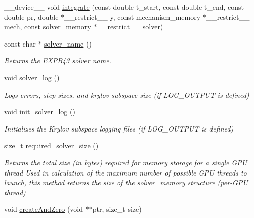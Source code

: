 \begin{DoxyCompactItemize}
\item 
\+\_\+\+\_\+device\+\_\+\+\_\+ void \hyperlink{namespaceexprb43cu_ad98c42138e12fe026951999e87b1ceb4}{integrate} (const double t\+\_\+start, const double t\+\_\+end, const double pr, double $\ast$\+\_\+\+\_\+restrict\+\_\+\+\_\+ y, const mechanism\+\_\+memory $\ast$\+\_\+\+\_\+restrict\+\_\+\+\_\+ mech, const \hyperlink{structexprb43cu_1_1solver__memory}{solver\+\_\+memory} $\ast$\+\_\+\+\_\+restrict\+\_\+\+\_\+ solver)
\item 
const char $\ast$ \hyperlink{namespaceexprb43cu_adb32cc589856026fca36d47f1982ee00}{solver\+\_\+name} ()
\begin{DoxyCompactList}\small\item\em Returns the E\+X\+P\+B43 solver name. \end{DoxyCompactList}\item 
void \hyperlink{namespaceexprb43cu_a77622bf304d732c5402474fe69dbb4a2}{solver\+\_\+log} ()
\begin{DoxyCompactList}\small\item\em Logs errors, step-\/sizes, and krylov subspace size (if L\+O\+G\+\_\+\+O\+U\+T\+P\+UT is defined) \end{DoxyCompactList}\item 
void \hyperlink{namespaceexprb43cu_a61e02bb434629c817de6934d514fc96c}{init\+\_\+solver\+\_\+log} ()
\begin{DoxyCompactList}\small\item\em Initializes the Krylov subspace logging files (if L\+O\+G\+\_\+\+O\+U\+T\+P\+UT is defined) \end{DoxyCompactList}\item 
size\+\_\+t \hyperlink{namespaceexprb43cu_ad837089abb4cfc3819786aad86440da0}{required\+\_\+solver\+\_\+size} ()
\begin{DoxyCompactList}\small\item\em Returns the total size (in bytes) required for memory storage for a single G\+PU thread Used in calculation of the maximum number of possible G\+PU threads to launch, this method returns the size of the \hyperlink{structexprb43cu_1_1solver__memory}{solver\+\_\+memory} structure (per-\/\+G\+PU thread) \end{DoxyCompactList}\item 
void \hyperlink{namespaceexprb43cu_a411c61dc481c439d2a19e8f17ec5af63}{create\+And\+Zero} (void $\ast$$\ast$ptr, size\+\_\+t size)
\item 
$$
\end{DoxyCompactItemize}
